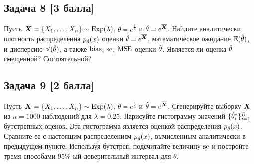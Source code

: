 \documentclass{article}
\begin{document}
\subsection*{Задача 8 [3 балла]}
Пусть $\boldsymbol{X} = \{X_1,\ldots, X_n\} \sim \mathrm{Exp}(\lambda)$, $\theta = e^{\frac{1}{\lambda}}$ и $\hat{\theta} = e^{\overline{\boldsymbol{X}}}$. Найдите аналитически плотность распределения $p_{\hat{\theta}}(x)$ оценки $\hat{\theta} = e^{\overline{\boldsymbol{X}}}$, математическое ожидание $\mathbb{E}(\hat{\theta})$,  и дисперсию $\mathbb{V}(\hat{\theta})$, а также $\mathrm{bias}$, $\mathrm{se}$, $\mathrm{MSE}$ оценки $\hat{\theta}$. Является ли оценка $\hat{\theta}$ смещенной? Состоятельной?

\subsection*{Задача 9 [2 балла]}
Пусть $\boldsymbol{X} = \{X_1,\ldots, X_n\} \sim \mathrm{Exp}(\lambda)$, $\theta = e^{\frac{1}{\lambda}}$ и $\hat{\theta} = e^{\overline{\boldsymbol{X}}}$. Сгенерируйте выборку $\boldsymbol{X}$ из $n = 1000$ наблюдений для $\lambda = 0.25$. Нарисуйте гистограмму значений $\{\hat{\theta}^*_i\}_{i=1}^B$ бутстрепных оценок. Эта гистограмма является оценкой распределения $p_{\hat{\theta}}(x)$. Сравните ее с настоящим распределением $p_{\hat{\theta}}(x)$, вычисленным аналитически в предыдущем пункте. Используя бутстреп, подсчитайте величину $\mathrm{se}$ и постройте тремя способами $95\%$-ый доверительный интервал для $\theta$. 
\end{document}
